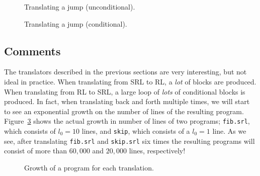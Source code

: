 \begin{figure}[H]
  
  \caption{Translating a jump (unconditional).}\label{fig:rltrlJumpGoto}
\end{figure}

\begin{figure}[H]
  
  \caption{Translating a jump (conditional).}\label{fig:rltrlJumpIf}
\end{figure}

\subsection{Comments}
The translators described in the previous sections are very interesting, but not ideal in practice. When translating from SRL to RL, a \textit{lot} of blocks are produced. When translating from RL to SRL, a large loop of \textit{lots} of conditional blocks is produced. In fact, when translating back and forth multiple times, we will start to see an exponential growth on the number of lines of the resulting program. Figure~\ref{fig:linesfig} shows the actual growth in number of lines of two programs; \texttt{fib.srl}, which consists of $l_0=10$ lines, and \texttt{skip}, which consists of a $l_0=1$ line. As we see, after translating \texttt{fib.srl} and \texttt{skip.srl} six times the resulting programs will consist of more than $60,000$ and $20,000$ lines, respectively!

\pgfplotsset{compat = 1.3}
\begin{figure}[H]
\centering


  \caption{Growth of a program for each translation.}\label{fig:linesfig}%
\end{figure}
